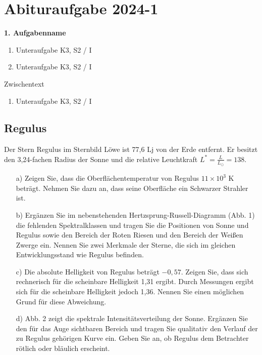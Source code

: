 \chapter{Abituraufgabe 2024-1}\label{Denk}

\begin{aufgabe}
	\textbf{1. Aufgabenname}
	\begin{enumerate}
		\item Unteraufgabe \hfill K3, S2 / I
		\item Unteraufgabe \hfill K3, S2 / I
	\end{enumerate}
	Zwischentext
	\begin{enumerate}[resume]
		\item Unteraufgabe \hfill K3, S2 / I
	\end{enumerate}
\end{aufgabe}
\maketitle

\section*{Regulus}

Der Stern Regulus im Sternbild Löwe ist 77,6 Lj von der Erde entfernt. Er besitzt den 3,24-fachen Radius der Sonne und die relative Leuchtkraft $L^* = \frac{L}{L_\odot} = 138$.

\begin{enumerate}
    \item[a)] Zeigen Sie, dass die Oberflächentemperatur von Regulus $11 \times 10^3$ K beträgt. Nehmen Sie dazu an, dass seine Oberfläche ein Schwarzer Strahler ist.

    \item[b)] Ergänzen Sie im nebenstehenden Hertzsprung-Russell-Diagramm (Abb. 1) die fehlenden Spektralklassen und tragen Sie die Positionen von Sonne und Regulus sowie den Bereich der Roten Riesen und den Bereich der Weißen Zwerge ein. Nennen Sie zwei Merkmale der Sterne, die sich im gleichen Entwicklungsstand wie Regulus befinden.

    \item[c)] Die absolute Helligkeit von Regulus beträgt $-0,57$. Zeigen Sie, dass sich rechnerisch für die scheinbare Helligkeit 1,31 ergibt. Durch Messungen ergibt sich für die scheinbare Helligkeit jedoch 1,36. Nennen Sie einen möglichen Grund für diese Abweichung.

    \item[d)] Abb. 2 zeigt die spektrale Intensitätsverteilung der Sonne. Ergänzen Sie den für das Auge sichtbaren Bereich und tragen Sie qualitativ den Verlauf der zu Regulus gehörigen Kurve ein. Geben Sie an, ob Regulus dem Betrachter rötlich oder bläulich erscheint.
\end{enumerate}

